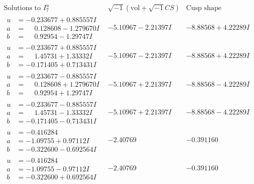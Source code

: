 \documentclass[1p]{elsarticle_modified}
\theoremstyle{definition}
\newcommand{\I}{\sqrt{-1}}
\begin{document}
$$\begin{array}{c|c|c}  
\text{Solutions to }I^u_{7}& \I (\text{vol} + \sqrt{-1}CS) & \text{Cusp shape}\\
 \hline 
\begin{aligned}
u &= -0.233677 + 0.885557 I \\
a &= \phantom{-}0.128608 - 1.279670 I \\
b &= \phantom{-}0.92954 - 1.29747 I\end{aligned}
 & -5.10967 - 2.21397 I & -8.88568 + 4.22289 I \\ \hline\begin{aligned}
u &= -0.233677 + 0.885557 I \\
a &= \phantom{-}1.45731 + 1.33332 I \\
b &= -0.171405 + 0.713431 I\end{aligned}
 & -5.10967 - 2.21397 I & -8.88568 + 4.22289 I \\ \hline\begin{aligned}
u &= -0.233677 - 0.885557 I \\
a &= \phantom{-}0.128608 + 1.279670 I \\
b &= \phantom{-}0.92954 + 1.29747 I\end{aligned}
 & -5.10967 + 2.21397 I & -8.88568 - 4.22289 I \\ \hline\begin{aligned}
u &= -0.233677 - 0.885557 I \\
a &= \phantom{-}1.45731 - 1.33332 I \\
b &= -0.171405 - 0.713431 I\end{aligned}
 & -5.10967 + 2.21397 I & -8.88568 - 4.22289 I \\ \hline\begin{aligned}
u &= -0.416284\phantom{ +0.000000I} \\
a &= -1.09755 + 0.97112 I \\
b &= -0.322600 - 0.692564 I\end{aligned}
 & -2.40769\phantom{ +0.000000I} & -0.391160\phantom{ +0.000000I} \\ \hline\begin{aligned}
u &= -0.416284\phantom{ +0.000000I} \\
a &= -1.09755 - 0.97112 I \\
b &= -0.322600 + 0.692564 I\end{aligned}
 & -2.40769\phantom{ +0.000000I} & -0.391160\phantom{ +0.000000I} \\ \hline\begin{aligned}

\end{aligned}
\end{array}$$
\end{document}
